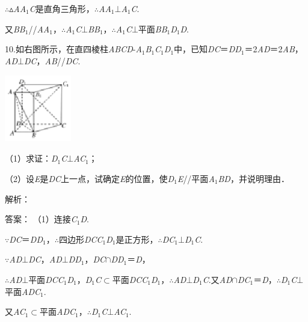 \documentclass{article} %
\begin{document}
$\mathrm{\therefore}$$\mathrm{\vartriangle}$\textit{AA}${}_{1}$\textit{C}是直角三角形，$\mathrm{\therefore}$\textit{AA}${}_{1}$$\mathrm{\bot}$\textit{A}${}_{1}$\textit{C}.

又\textit{BB}${}_{1}$//\textit{AA}${}_{1}$，$\mathrm{\therefore}$\textit{A}${}_{1}$\textit{C}$\mathrm{\bot}$\textit{BB}${}_{1}$，$\mathrm{\therefore}$\textit{A}${}_{1}$\textit{C}$\mathrm{\bot}$平面\textit{BB}${}_{1}$\textit{D}${}_{1}$\textit{D}.

10.如右图所示，在直四棱柱\textit{ABCD}-\textit{A}${}_{1}$\textit{B}${}_{1}$\textit{C}${}_{1}$\textit{D}${}_{1}$中，已知\textit{DC}＝\textit{DD}${}_{1}$＝2\textit{AD}＝2\textit{AB}，\textit{AD}$\mathrm{\bot}$\textit{DC}，\textit{AB}//\textit{DC}.

\includegraphics*[width=1.15in, height=1.15in, keepaspectratio=false]{image238}

（1）求证：\textit{D}${}_{1}$\textit{C}$\mathrm{\bot}$\textit{AC}${}_{1}$；

（2）设\textit{E}是\textit{DC}上一点，试确定\textit{E}的位置，使\textit{D}${}_{1}$\textit{E}//平面\textit{A}${}_{1}$\textit{BD}，并说明理由．

解析：

答案：
（1）连接\textit{C}${}_{1}$\textit{D}.

$\mathrm{\because}$\textit{DC}＝\textit{DD}${}_{1}$，$\mathrm{\therefore}$四边形\textit{DCC}${}_{1}$\textit{D}${}_{1}$是正方形，$\mathrm{\therefore}$\textit{DC}${}_{1}$$\mathrm{\bot}$\textit{D}${}_{1}$\textit{C}.

$\mathrm{\because}$\textit{AD}$\mathrm{\bot}$\textit{DC}，\textit{AD}$\mathrm{\bot}$\textit{DD}${}_{1}$，\textit{DC}$\mathrm{\cap}$\textit{DD}${}_{1}$＝\textit{D}，

$\mathrm{\therefore}$\textit{AD}$\mathrm{\bot}$平面\textit{DCC}${}_{1}$\textit{D}${}_{1}$，\textit{D}${}_{1}$\textit{C}$\mathrm{\subset }$平面\textit{DCC}${}_{1}$\textit{D}${}_{1}$，$\mathrm{\therefore}$\textit{AD}$\mathrm{\bot}$\textit{D}${}_{1}$\textit{C}.又\textit{AD}$\mathrm{\cap}$\textit{DC}${}_{1}$＝\textit{D}，$\mathrm{\therefore}$\textit{D}${}_{1}$\textit{C}$\mathrm{\bot}$平面\textit{ADC}${}_{1}$.

又\textit{AC}${}_{1}$$\mathrm{\subset }$平面\textit{ADC}${}_{1}$，$\mathrm{\therefore}$\textit{D}${}_{1}$\textit{C}$\mathrm{\bot}$\textit{AC}${}_{1}$.
\end{document}

